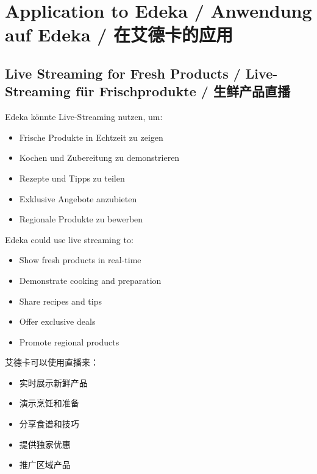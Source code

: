 \section{Application to Edeka / Anwendung auf Edeka / 在艾德卡的应用}

\subsection{Live Streaming for Fresh Products / Live-Streaming für Frischprodukte / 生鲜产品直播}

\begin{otherlanguage}{ngerman}
Edeka könnte Live-Streaming nutzen, um:
\begin{itemize}
    \item Frische Produkte in Echtzeit zu zeigen
    \item Kochen und Zubereitung zu demonstrieren
    \item Rezepte und Tipps zu teilen
    \item Exklusive Angebote anzubieten
    \item Regionale Produkte zu bewerben
\end{itemize}
\end{otherlanguage}

Edeka could use live streaming to:
\begin{itemize}
    \item Show fresh products in real-time
    \item Demonstrate cooking and preparation
    \item Share recipes and tips
    \item Offer exclusive deals
    \item Promote regional products
\end{itemize}

艾德卡可以使用直播来：
\begin{itemize}
    \item 实时展示新鲜产品
    \item 演示烹饪和准备
    \item 分享食谱和技巧
    \item 提供独家优惠
    \item 推广区域产品
\end{itemize}


